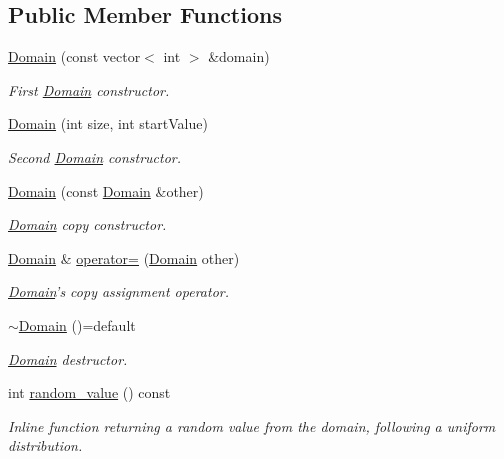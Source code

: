 \subsection*{Public Member Functions}
\begin{DoxyCompactItemize}
\item 
\hyperlink{classghost_1_1Domain_adbdf32b7d0129175ec320f4b7c10132e}{Domain} (const vector$<$ int $>$ \&domain)
\begin{DoxyCompactList}\small\item\em First \hyperlink{classghost_1_1Domain}{Domain} constructor. \end{DoxyCompactList}\item 
\hyperlink{classghost_1_1Domain_a6a9f7b0aec78acb0b0f4edefaea7a6e9}{Domain} (int size, int start\-Value)
\begin{DoxyCompactList}\small\item\em Second \hyperlink{classghost_1_1Domain}{Domain} constructor. \end{DoxyCompactList}\item 
\hyperlink{classghost_1_1Domain_ae2419e072b48d1aaa5e9aedc36babbb6}{Domain} (const \hyperlink{classghost_1_1Domain}{Domain} \&other)
\begin{DoxyCompactList}\small\item\em \hyperlink{classghost_1_1Domain}{Domain} copy constructor. \end{DoxyCompactList}\item 
\hyperlink{classghost_1_1Domain}{Domain} \& \hyperlink{classghost_1_1Domain_a69c6fb58d1811b8306d1dc8b0aaa6778}{operator=} (\hyperlink{classghost_1_1Domain}{Domain} other)
\begin{DoxyCompactList}\small\item\em \hyperlink{classghost_1_1Domain}{Domain}'s copy assignment operator. \end{DoxyCompactList}\item 
\hyperlink{classghost_1_1Domain_aa5d4791c2f90c021d9f19746f4694039}{$\sim$\-Domain} ()=default
\begin{DoxyCompactList}\small\item\em \hyperlink{classghost_1_1Domain}{Domain} destructor. \end{DoxyCompactList}\item 
int \hyperlink{classghost_1_1Domain_a5d12f840be7a0ddd673c85d70426a75e}{random\-\_\-value} () const 
\begin{DoxyCompactList}\small\item\em Inline function returning a random value from the domain, following a uniform distribution. \end{DoxyCompactList}\item 

\end{DoxyCompactItemize}
